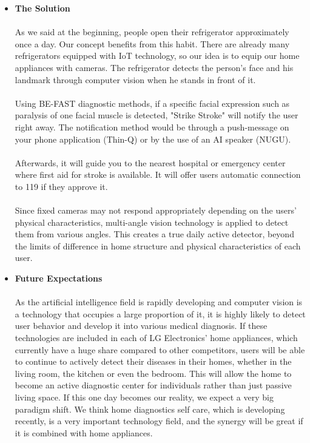 \begin{itemize}
    \item \textbf{The Solution}\\
    \\As we said at the beginning, \cite{r7} people open their refrigerator approximately once a day. Our concept benefits from this habit. There are already many refrigerators equipped with IoT technology, so our idea is to equip our home appliances with cameras. The refrigerator detects the person's face and his landmark through computer vision when he stands in front of it.\\ \\Using BE-FAST diagnostic methods, if a specific facial expression such as paralysis of one facial muscle is detected, "Strike Stroke" will notify the user right away. The notification method would be through a push-message on your phone application (Thin-Q) or by the use of an AI speaker (NUGU).\\ \\Afterwards, it will guide you to the nearest hospital or emergency center where first aid for stroke is available. It will offer users automatic connection to 119 if they approve it.\\ \\Since fixed cameras may not respond appropriately depending on the users' physical characteristics, \cite{r13} multi-angle vision technology is applied to detect them from various angles. This creates a true daily active detector, beyond the limits of difference in home structure and physical characteristics of each user.\\
\end{itemize}
\begin{itemize}
    \item \textbf{Future Expectations}\\
    \\As the artificial intelligence field is rapidly developing and computer vision is a technology that occupies a large proportion of it, it is highly likely to detect user behavior and develop it into various medical diagnosis. If these technologies are included in each of LG Electronics' home appliances, which currently have a huge share compared to other competitors, users will be able to continue to actively detect their diseases in their homes, whether in the living room, the kitchen or even the bedroom. This will allow the home to become an active diagnostic center for individuals rather than just passive living space. If this one day becomes our reality, we expect a very big paradigm shift. \cite{r14} We think home diagnostics self care, which is developing recently, is a very important technology field, and the synergy will be great if it is combined with home appliances.\\
\end{itemize}

